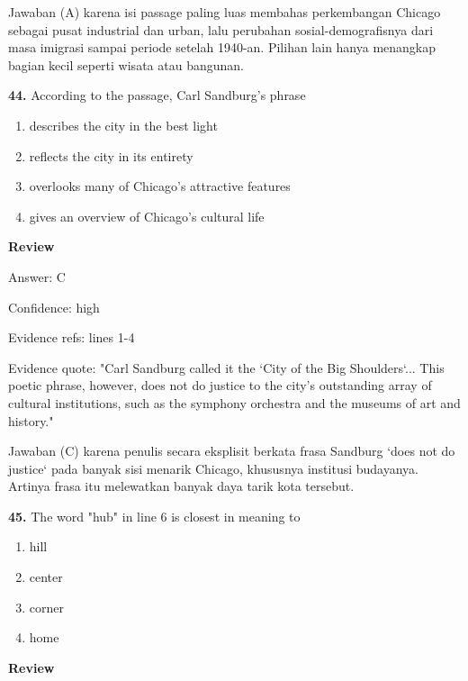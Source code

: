 \documentclass[12pt]{article}
\begin{document}
Jawaban (A) karena isi passage paling luas membahas perkembangan Chicago sebagai pusat industrial dan urban, lalu perubahan sosial-demografisnya dari masa imigrasi sampai periode setelah 1940-an. Pilihan lain hanya menangkap bagian kecil seperti wisata atau bangunan.\par
\endgroup
\par
\vspace{0.25\baselineskip}
\noindent\textbf{44.} According to the passage, Carl Sandburg's phrase
\begin{enumerate}[label=(\Alph*),leftmargin=*,itemsep=0.2em]
\item describes the city in the best light
\item reflects the city in its entirety
\item overlooks many of Chicago's attractive features
\item gives an overview of Chicago's cultural life
\end{enumerate}
\par
\begingroup
\setlength{\parskip}{0pt}
\setlength{\parindent}{0pt}
\textbf{Review}\par
Answer: C\par
Confidence: high\par
Evidence refs: lines 1-4\par
Evidence quote: "Carl Sandburg called it the `City of the Big Shoulders`... This poetic phrase, however, does not do justice to the city's outstanding array of cultural institutions, such as the symphony orchestra and the museums of art and history."\par
Jawaban (C) karena penulis secara eksplisit berkata frasa Sandburg `does not do justice` pada banyak sisi menarik Chicago, khususnya institusi budayanya. Artinya frasa itu melewatkan banyak daya tarik kota tersebut.\par
\endgroup
\par
\vspace{0.25\baselineskip}
\noindent\textbf{45.} The word "hub" in line 6 is closest in meaning to
\begin{enumerate}[label=(\Alph*),leftmargin=*,itemsep=0.2em]
\item hill
\item center
\item corner
\item home
\end{enumerate}
\par
\begingroup
\setlength{\parskip}{0pt}
\setlength{\parindent}{0pt}
\textbf{Review}\par
\end{document}
